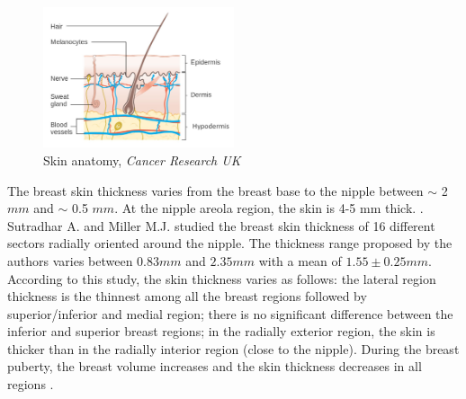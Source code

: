 \begin{figure}[!h]
\centering
\centerline{\includegraphics[width=0.5\textwidth,keepaspectratio]{figures/skin_2.jpg} }
\caption{Skin anatomy, \textit{Cancer Research UK}}
\label{fig:skinanatomy}
\end{figure}



The breast skin thickness varies from the breast base to the nipple between $\sim$ 2 $mm$ and $\sim$ 0.5 $mm$. At the nipple areola region, the skin is 4-5 mm thick.
 \citep{andolina2011mammographic}. Sutradhar A. and Miller M.J. \citep{sutradhar_vivo_2013} studied the breast skin thickness of 16 different sectors radially oriented around the nipple. The thickness range proposed by the authors varies between $0.83 mm$ and $2.35 mm$ with a mean of $1.55 \pm 0.25 mm$. According to this study, the skin thickness varies as follows: the lateral
region thickness is the thinnest among all the breast regions followed by superior/inferior and medial region; there is no significant difference between the inferior and superior breast regions; in the radially exterior region, the skin is thicker than in the radially interior region (close to the nipple).  During the breast puberty, the breast volume increases and the skin thickness decreases in all regions \citep{ulger2003effect}.

